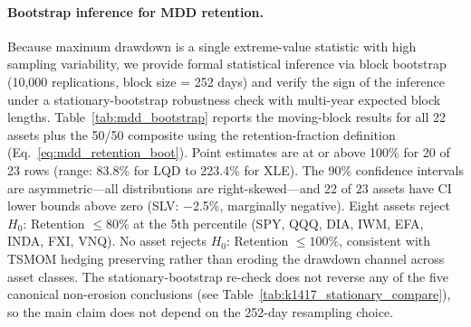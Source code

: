 \paragraph{Bootstrap inference for MDD retention.} Because maximum drawdown is a single extreme-value statistic with high sampling variability, we provide formal statistical inference via block bootstrap (10,000 replications, block size = 252 days) and verify the sign of the inference under a stationary-bootstrap robustness check with multi-year expected block lengths. Table~\ref{tab:mdd_bootstrap} reports the moving-block results for all 22 assets plus the 50/50 composite using the retention-fraction definition (Eq.~\ref{eq:mdd_retention_boot}). Point estimates are at or above 100\% for 20 of 23 rows (range: 83.8\% for LQD to 223.4\% for XLE). The 90\% confidence intervals are asymmetric---all distributions are right-skewed---and 22 of 23 assets have CI lower bounds above zero (SLV: $-$2.5\%, marginally negative). Eight assets reject $H_0$: Retention $\leq 80\%$ at the 5th percentile (SPY, QQQ, DIA, IWM, EFA, INDA, FXI, VNQ). No asset rejects $H_0$: Retention $\leq 100\%$, consistent with TSMOM hedging preserving rather than eroding the drawdown channel across asset classes. The stationary-bootstrap re-check does not reverse any of the five canonical non-erosion conclusions (see Table~\ref{tab:k1417_stationary_compare}), so the main claim does not depend on the 252-day resampling choice.

